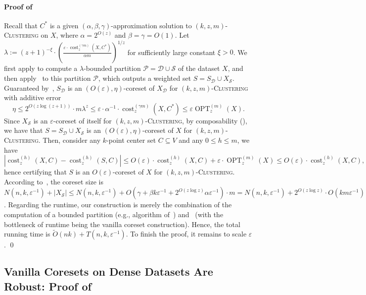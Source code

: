 \documentclass[letterpaper,11pt]{article}
\theoremstyle{plain}
\theoremstyle{definition}
\theoremstyle{remark}
\DeclareMathOperator{\cost}{cost}
\DeclareMathOperator{\OPT}{OPT}
\newcommand{\eps}{\varepsilon}
\newcommand{\calD}{\mathcal{D}}
\newcommand{\calP}{\mathcal{P}}
\newcommand{\calS}{\mathcal{S}}
\newcommand{\ProblemName}[1]{\textsc{#1}}
\newcommand{\kzmC}{\ProblemName{$(k,z,m)$-Clustering}\xspace}
\begin{document}
\paragraph{Proof of~} 
Recall that $C^*$ is a given $(\alpha,\beta,\gamma)$-approximation solution to \kzmC on $X$, where $\alpha = 2^{O(z)}$ and $\beta = \gamma = O(1)$.
Let $\lambda:= (z+1)^{-\xi}\cdot \left(\frac{\eps\cdot \cost_z^{(\gamma m)}(X,C^*)}{\alpha m} \right)^{1/z}$ for sufficiently large constant $\xi > 0$. 
We first apply  to compute a $\lambda$-bounded partition $\calP=\calD\cup\calS$ of the dataset $X$, and then apply~ to this partition $\calP$, which outputs a weighted set $S = S_{\calD}\cup X_{\calS}$.
Guaranteed by~, $S_{\calD}$ is an $(O(\eps),\eta)$-coreset of $X_{\calD}$ for \kzmC with additive error
\begin{equation*}
    \eta\le 2^{O(z\log(z+1))}\cdot m\lambda^z\le \eps\cdot\alpha^{-1}\cdot\cost_z^{(\gamma m)}(X,C^*)\le \eps\OPT_z^{(m)}(X).
\end{equation*}
Since $X_{\calS}$ is an $\eps$-coreset of itself for \kzmC, by composability (), we have that $S = S_{\calD}\cup X_{\calS}$ is an $(O(\eps),\eta)$-coreset of $X$ for \kzmC. Then, consider any $k$-point center set $C\subseteq V$ and any $0\le h\le m$, we have 
\begin{equation*}
    \left|\cost_z^{(h)}(X,C) - \cost_z^{(h)}(S,C) \right|\le O(\eps)\cdot \cost_z^{(h)}(X,C) + \eps\cdot\OPT_z^{(m)}(X)\le O(\eps)\cdot \cost_z^{(h)}(X,C),
\end{equation*}
hence certifying that $S$ is an $O(\eps)$-coreset of $X$ for \kzmC.
According to~, the coreset size is $N(n,k,\eps^{-1}) + |X_{\calS}|\le N(n,k,\eps^{-1}) + O(\gamma + \beta k\eps^{-1} + 2^{O(z\log z)}\alpha\eps^{-1})\cdot m = N(n,k,\eps^{-1}) + 2^{O(z\log z)}\cdot O(km\eps^{-1})$. 
Regarding the runtime, our construction is merely the combination of 
the computation of a bounded partition (e.g., algorithm of~) and~ (with the bottleneck of runtime being the vanilla coreset construction).
Hence, the total running time is $\tilde O(nk) + T(n,k,\eps^{-1})$. To finish the proof, it remains to scale $\eps$.
\qed


      \subsection{Vanilla Coresets on Dense Datasets Are Robust: Proof of~}
\label{sec:first reduction}
\end{document}
